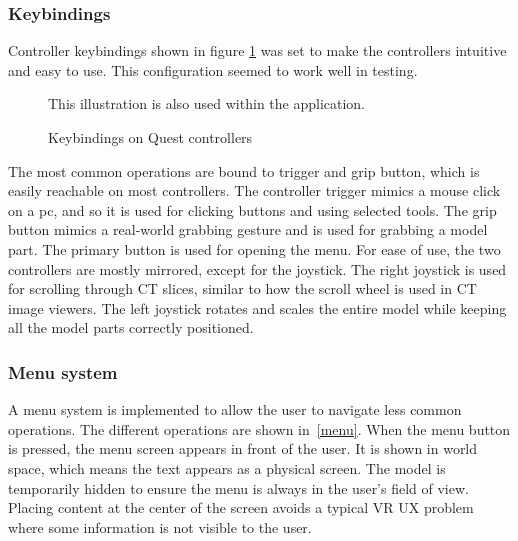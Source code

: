\documentclass[a4paper]{report}
\begin{document}
\subsubsection{Keybindings}
Controller keybindings shown in figure \ref{controllers} was set to make the controllers intuitive and easy to use. This configuration seemed to work well in testing.

\begin{figure}[h!]
    \centering
	\hfill
	\caption{Keybindings on Quest controllers}\label{controllers}
  \small
  This illustration is also used within the application.
\end{figure}

The most common operations are bound to trigger and grip button, which is easily reachable on most controllers. The controller trigger mimics a mouse click on a pc, and so it is used for clicking buttons and using selected tools. The grip button mimics a real-world grabbing gesture and is used for grabbing a model part.
The primary button is used for opening the menu.
For ease of use, the two controllers are mostly mirrored, except for the joystick. The right joystick is used for scrolling through CT slices, similar to how the scroll wheel is used in CT image viewers. The left joystick rotates and scales the entire model while keeping all the model parts correctly positioned.

\subsubsection{Menu system}
A menu system is implemented to allow the user to navigate less common operations. The different operations are shown in~\ref{menu}.
When the menu button is pressed, the menu screen appears in front of the user. It is shown in world space, which means the text appears as a physical screen. The model is temporarily hidden to ensure the menu is always in the user's field of view. Placing content at the center of the screen avoids a typical VR UX problem where some information is not visible to the user.
\end{document}
